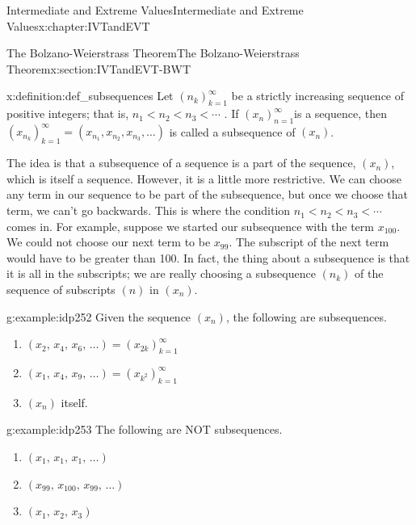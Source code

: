 \begin{chapterptx}{Intermediate and Extreme Values}{}{Intermediate and Extreme Values}{}{}{x:chapter:IVTandEVT}
\begin{sectionptx}{The Bolzano-Weierstrass Theorem}{}{The Bolzano-Weierstrass Theorem}{}{}{x:section:IVTandEVT-BWT}
		\begin{definition}{}{x:definition:def_subsequences}%
			 Let \(\left(n_k\right)_{k=1}^\infty\) be a strictly increasing sequence of positive integers; that is, \(n_1\lt n_2\lt n_3\lt \cdots\) . If \(\left(x_n\right)_{n=1}^\infty\)is a sequence, then \(\left(x_{n_k}\right)_{k=1}^\infty=\left(x_{n_1},x_{n_2},x_{n_3},\ldots \right)\) is called a \textbraceleft{}subsequence\textbraceright{} of \(\left(x_n\right)\).%
		\end{definition}
		The idea is that a subsequence of a sequence is a part of the sequence, \((x_n)\), which is itself a sequence. However, it is a little more restrictive. We can choose any term in our sequence to be part of the subsequence, but once we choose that term, we can't go backwards. This is where the condition \(n_1\lt n_2\lt n_3\lt \cdots\) comes in. For example, suppose we started our subsequence with the term \(x_{100}\). We could not choose our next term to be \(x_{99}\). The subscript of the next term would have to be greater than 100. In fact, the thing about a subsequence is that it is all in the subscripts; we are really choosing a subsequence \(\left(n_k\right)\) of the sequence of subscripts \(\left(n\right)\) in \(\left(x_n\right)\).%
		\begin{example}{}{g:example:idp252}%
			Given the sequence \(\left(x_n\right)\), the following are subsequences.%
			\begin{enumerate}[font=\bfseries,label=(\alph*),ref=\alph*]
				\item{}\(\left(x_2,\,x_4,\,x_6,\,\ldots\right)=\left(x_{2k}\right)_{k=1}^\infty\)%
				\item{}\(\left(x_1,\,x_4,\,x_9,\,\ldots\right)=\left(x_{k^2}\right)_{k=1}^ \infty\)%
				\item{}\(\left(x_n\right)\) itself.%
			\end{enumerate}
		\end{example}
		\begin{example}{}{g:example:idp253}%
			The following are NOT subsequences.%
			\begin{enumerate}[font=\bfseries,label=(\alph*),ref=\alph*]
				\item{}\(\left(x_1,\,x_1,\,x_1,\,\ldots\right)\)%
				\item{}\(\left(x_{99},\,x_{100},\,x_{99},\,\ldots\right)\)%
				\item{}\(\left(x_1,\,x_2,\,x_3\right)\)%
			\end{enumerate}
		\end{example}

\end{sectionptx}
\end{chapterptx}

